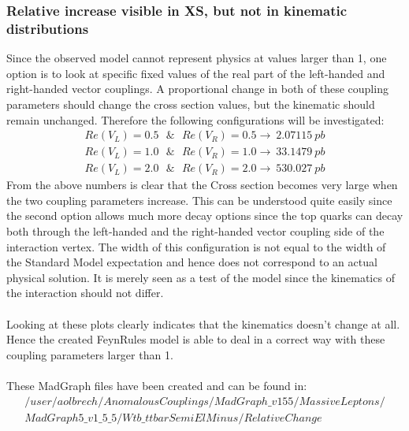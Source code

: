 \documentclass[a4paper,12pt]{report}
\begin{document}
\subsubsection{Relative increase visible in XS, but not in kinematic distributions}
Since the observed model cannot represent physics at values larger than 1, one option is to look at specific fixed values of the real part of the left-handed and right-handed vector couplings. 
A proportional change in both of these coupling parameters should change the cross section values, but the kinematic should remain unchanged. Therefore the following configurations will be investigated:
\begin{eqnarray*}
  Re(V_L) = 0.5 ~~~ \& ~~~ Re(V_R) = 0.5 \rightarrow ~2.07115~ pb\\
  Re(V_L) = 1.0 ~~~ \& ~~~ Re(V_R) = 1.0 \rightarrow ~33.1479~ pb\\
  Re(V_L) = 2.0 ~~~ \& ~~~ Re(V_R) = 2.0 \rightarrow ~530.027~ pb
\end{eqnarray*}
From the above numbers is clear that the Cross section becomes very large when the two coupling parameters increase.
This can be understood quite easily since the second option allows much more decay options since the top quarks can decay both through the left-handed and the right-handed vector coupling side of the interaction vertex. The width of this configuration is not equal to the width of the Standard Model expectation and hence does not correspond to an actual physical solution. It is merely seen as a test of the model since the kinematics of the interaction should not differ.\\
\\
Looking at these plots clearly indicates that the kinematics doesn't change at all.\\
Hence the created FeynRules model is able to deal in a correct way with these coupling parameters larger than 1.\\
\\
These MadGraph files have been created and can be found in:
\begin{eqnarray*}
  /user/aolbrech/AnomalousCouplings/MadGraph\_v155/MassiveLeptons/\\ MadGraph5\_v1\_5\_5/Wtb\_ttbarSemiElMinus/RelativeChange
\end{eqnarray*}
\end{document}
